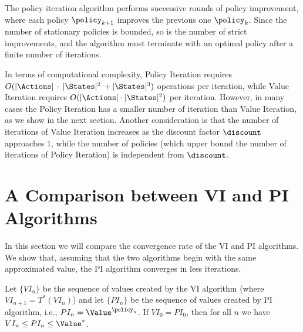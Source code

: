 The policy iteration algorithm performs successive rounds of policy
improvement, where each policy ${\policy _{k + 1}}$ improves the
previous one ${\policy _k}$. Since the number of stationary policies
is bounded, so is the number of strict improvements, and the
algorithm must terminate with an optimal policy after a finite
number of iterations.

In terms of computational complexity, Policy Iteration requires
$O(|\Actions|\, \cdot \,|\States|^2\, + |\States|^3)$ operations per
iteration, while Value Iteration requires $O(|\Actions| \cdot
|\States|^2)$ per iteration.
%
However, in many cases the Policy Iteration has a smaller number of
iteration  than Value Iteration, as we show in the next section.
%
Another consideration is that the number of iterations of Value
Iteration increases as the discount factor $\discount $ approaches
$1$, while the number of policies (which upper bound the number of
iterations of Policy Iteration) is independent from $\discount$.


\section{A Comparison between VI and PI Algorithms}

In this section we will compare the convergence rate of the VI and
PI algorithms. We show that, assuming that the two algorithms begin
with the same approximated value, the PI algorithm converges in less
iterations.
\begin{theorem}
\label{L6:PIVI-ComparisonTh} Let $\{VI_{n}\}$ be the sequence of
values created by the VI algorithm (where $VI_{n+1}=T^*(VI_{n})$)
and let $\{PI_{n}\}$ be the sequence of values created by PI
algorithm, i.e., $PI_n=\Value^{\policy_n}$. If $VI_{0}=PI_{0}$, then
for all $ n$ we have $ VI_{n}\leq PI_{n}\leq \Value^*$.
\end{theorem}

